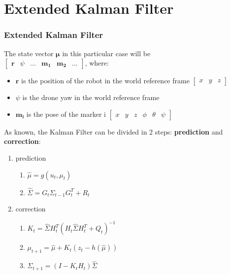 \documentclass{beamer}
\begin{document}
    \section{Extended Kalman Filter}
    \begin{frame}
        \justifying
        \frametitle{Extended Kalman Filter}

        The state vector $\bm{\mu}$ in this particular case will be \\ $\begin{bmatrix} \bm{r} & \psi & ... & \bm{m_1} & \bm{m_2} & ... \end{bmatrix}$, where:
        \begin{itemize}
            \item{$\bm{r}$ is the position of the robot in the world reference frame $\begin{bmatrix}x & y & z\end{bmatrix}$}
            \item{$\psi$ is the drone yaw in the world reference frame}
            \item{$\bm{m_i}$ is the pose of the marker i $\begin{bmatrix}x & y & z & \phi & \theta & \psi \end{bmatrix}$}
        \end{itemize}

    \end{frame}

    \begin{frame}
        \justifying

        As known, the Kalman Filter can be divided in 2 steps: \textbf{prediction} and \textbf{correction}:

        \begin{enumerate}
            \item{prediction}
            \begin{enumerate}
                \item{$\hat\mu = g \left( u_t , \mu_{t}  \right) $}
                \item{$\hat\Sigma = G_t \Sigma_{t-1} G_t^T + R_t $}
            \end{enumerate}
            \item{correction}
            \begin{enumerate}
                \item{$K_t = \hat\Sigma H_t^T \left( H_t \hat\Sigma H_t^T + Q_t \right)^{-1}$}
                \item{$\mu_{t+1} = \hat\mu + K_t \left( z_t - h \left( \hat\mu \right) \right) $}
                \item{$\Sigma_{t+1} = \left( I - K_t H_t \right) \hat\Sigma$}
            \end{enumerate}
        \end{enumerate}

    \end{frame}
\end{document}
